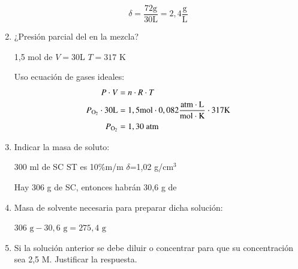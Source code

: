 \begin{enumerate}[left=0cm]
$$\delta = \dfrac{72 \text{g}}{30 \text{L}} = 2,4 \dfrac{\text{g}}{\text{L}}$$


\item ¿Presión parcial del  en la mezcla?

\hfil
1,5 mol de 
\hfil
$V = 30$L 
\hfil
$T=317$ K
\hfil

Uso ecuación de gases ideales:
\begin{align*}
    P\cdot V &= n \cdot R \cdot T\\
    P_{\ce{O2}} \cdot 30 \text{L} &= 1,5\text{mol} \cdot 0,082\dfrac{\text{atm}\cdot \text{L}}{\text{mol}\cdot\text{K}}  \cdot 317 \text{K}\\
    P_{\ce{O2}} &= 1,30 \text{ atm}
\end{align*}


\item Indicar la masa de soluto:

\hfil
300 ml de SC \hfil
ST es  \hfil 
10\%m/m\hfil
$\delta$=1,02 g/cm${^3}$ 
\hfil

Hay 306 g de SC, entonces habrán 30,6 g de 


\item Masa de solvente necesaria para preparar dicha solución:

\hfil$306\text{ g} - 30,6\text{ g} = 275,4\text{ g}$\hfil

\item Si la solución anterior se debe diluir o concentrar para que su concentración sea 2,5 M. Justificar la respuesta.

\end{enumerate}
